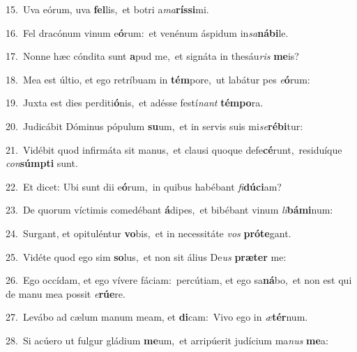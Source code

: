 {\numbfont\textcolor{\numbcolor}{15.}}~Uva eórum, uva \textbf{fel}\-lis,~\star et botri a\-\textit{ma}\-\textbf{rís}\textbf{si}mi.\par
{\numbfont\textcolor{\numbcolor}{16.}}~Fel dracónum vinum e\-\textbf{ó}\-rum:~\star et venénum áspidum in\-\textit{sa}\-\textbf{ná}\textbf{bi}le.\par
{\numbfont\textcolor{\numbcolor}{17.}}~Nonne hæc cóndita sunt \textbf{a}\-pud me,~\star et signáta in thesáu\textit{ris} \textbf{me}\-is?\par
{\numbfont\textcolor{\numbcolor}{18.}}~Mea est últio, et ego retríbuam in \textbf{tém}\-pore,~\star ut labátur pes \textit{e}\-\textbf{ó}rum:\par
{\numbfont\textcolor{\numbcolor}{19.}}~Juxta est dies perditi\-\textbf{ó}\-nis,~\star et adésse festí\textit{nant} \textbf{tém}\-\textbf{po}ra.\par
{\numbfont\textcolor{\numbcolor}{20.}}~Judicábit Dóminus pópulum \textbf{su}\-um,~\star et in servis suis mi\-\textit{se}\-\textbf{ré}\textbf{bi}tur:\par
{\numbfont\textcolor{\numbcolor}{21.}}~Vidébit quod infirmáta sit manus,~\dagger et clausi quoque defe\-\textbf{cé}\-runt,~\star residuíque \textit{con}\-\textbf{súmp}\textbf{ti} sunt.\par
{\numbfont\textcolor{\numbcolor}{22.}}~Et dicet: Ubi sunt dii e\-\textbf{ó}\-rum,~\star in quibus habébant \textit{fi}\-\textbf{dú}\textbf{ci}am?\par
{\numbfont\textcolor{\numbcolor}{23.}}~De quorum víctimis comedébant \textbf{á}\-dipes,~\star et bibébant vinum \textit{li}\-\textbf{bá}\textbf{mi}num:\par
{\numbfont\textcolor{\numbcolor}{24.}}~Surgant, et opituléntur \textbf{vo}\-bis,~\star et in necessitáte \textit{vos} \textbf{pró}\-\textbf{te}gant.\par
{\numbfont\textcolor{\numbcolor}{25.}}~Vidéte quod ego sim \textbf{so}\-lus,~\star et non sit álius De\textit{us} \textbf{præ}\-\textbf{ter} me:\par
{\numbfont\textcolor{\numbcolor}{26.}}~Ego occídam, et ego vívere fáciam:~\dagger percútiam, et ego sa\-\textbf{ná}\-bo,~\star et non est qui de manu mea possit \textit{e}\-\textbf{rú}\textbf{e}re.\par
{\numbfont\textcolor{\numbcolor}{27.}}~Levábo ad cælum manum meam, et \textbf{di}\-cam:~\star Vivo ego in \textit{æ}\-\textbf{tér}num.\par
{\numbfont\textcolor{\numbcolor}{28.}}~Si acúero ut fulgur gládium \textbf{me}\-um,~\star et arripúerit judícium ma\textit{nus} \textbf{me}\-a:\par
